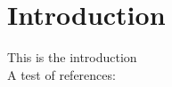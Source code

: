 \chapter{Introduction}
\label{chapter:introduction}

This is the introduction\\

A test of references: \citep{rodgers:00}





